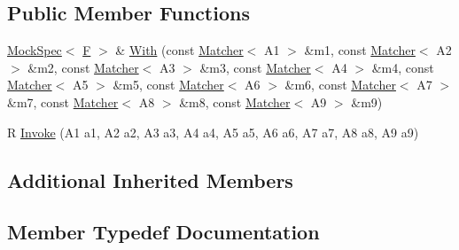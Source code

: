 \subsection*{Public Member Functions}
\begin{DoxyCompactItemize}
\item 
\hyperlink{classtesting_1_1internal_1_1MockSpec}{Mock\+Spec}$<$ \hyperlink{classtesting_1_1internal_1_1FunctionMocker_3_01R_07A1_00_01A2_00_01A3_00_01A4_00_01A5_00_01A6_00_01A7_00_01A8_00_01A9_08_4_a8de64ec5559bd4e4410a4374e9c93e4e}{F} $>$ \& \hyperlink{classtesting_1_1internal_1_1FunctionMocker_3_01R_07A1_00_01A2_00_01A3_00_01A4_00_01A5_00_01A6_00_01A7_00_01A8_00_01A9_08_4_a3e0109c07bbf25b3731e12a8df77230e}{With} (const \hyperlink{classtesting_1_1Matcher}{Matcher}$<$ A1 $>$ \&m1, const \hyperlink{classtesting_1_1Matcher}{Matcher}$<$ A2 $>$ \&m2, const \hyperlink{classtesting_1_1Matcher}{Matcher}$<$ A3 $>$ \&m3, const \hyperlink{classtesting_1_1Matcher}{Matcher}$<$ A4 $>$ \&m4, const \hyperlink{classtesting_1_1Matcher}{Matcher}$<$ A5 $>$ \&m5, const \hyperlink{classtesting_1_1Matcher}{Matcher}$<$ A6 $>$ \&m6, const \hyperlink{classtesting_1_1Matcher}{Matcher}$<$ A7 $>$ \&m7, const \hyperlink{classtesting_1_1Matcher}{Matcher}$<$ A8 $>$ \&m8, const \hyperlink{classtesting_1_1Matcher}{Matcher}$<$ A9 $>$ \&m9)
\item 
R \hyperlink{classtesting_1_1internal_1_1FunctionMocker_3_01R_07A1_00_01A2_00_01A3_00_01A4_00_01A5_00_01A6_00_01A7_00_01A8_00_01A9_08_4_a41568c246919848be0f760c61afb3382}{Invoke} (A1 a1, A2 a2, A3 a3, A4 a4, A5 a5, A6 a6, A7 a7, A8 a8, A9 a9)
\end{DoxyCompactItemize}
\subsection*{Additional Inherited Members}


\subsection{Member Typedef Documentation}
